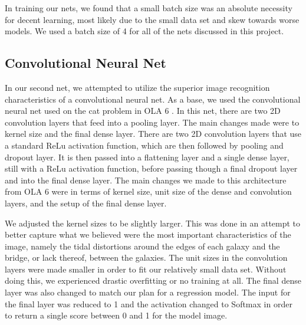\documentclass[conference]{IEEEtran}
\begin{document}
In training our nets, we found that a small batch size was an absolute necessity for decent learning, most likely due to the small data set and skew towards worse models. We used a batch size of 4 for all of the nets discussed in this project.

\subsection{Convolutional Neural Net}

In our second net, we attempted to utilize the superior image recognition characteristics of a convolutional neural net. As a base, we used the convolutional neural net used on the cat problem in OLA 6 \cite{phillips}. In this net, there are two 2D convolution layers that feed into a pooling layer.  The main changes made were to kernel size and the final dense layer. There are two 2D convolution layers that use a standard ReLu activation function, which are then followed by pooling and dropout layer. It is then passed into a flattening layer and a single dense layer, still with a ReLu activation function, before passing though a final dropout layer and into the final dense layer. The main changes we made to this architecture from OLA 6 were in terms of kernel size, unit size of the dense and convolution layers, and the setup of the final dense layer. 

We adjusted the kernel sizes to be slightly larger. This was done in an attempt to better capture what we believed were the most important characteristics of the image, namely the tidal distortions around the edges of each galaxy and the bridge, or lack thereof, between the galaxies. The unit sizes in the convolution layers were made smaller in order to fit our relatively small data set. Without doing this, we experienced drastic overfitting or no training at all. The final dense layer was also changed to match our plan for a regression model. The input for the final layer was reduced to 1 and the activation changed to Softmax in order to return a single score between 0 and 1 for the model image.
\end{document}
